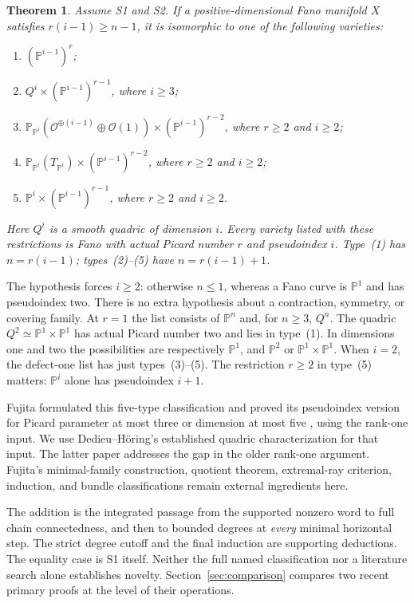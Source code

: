 \documentclass[11pt]{article}
\newtheorem{theorem}{Theorem}[section]
\theoremstyle{definition}\newtheorem{definition}[theorem]{Definition}
\theoremstyle{remark}\newtheorem{remark}[theorem]{Remark}
\newcommand{\PP}{\mathbb P}
\newcommand{\OO}{\mathcal O}
\begin{document}
\begin{theorem}\label{thm:main}
Assume S1 and S2. If a positive-dimensional Fano manifold $X$ satisfies
$r(i-1)\ge n-1$, it is isomorphic to one of the following varieties:
\begin{enumerate}[label=\textup{(\arabic*)}]
\item $(\PP^{i-1})^r$;
\item $Q^i\times(\PP^{i-1})^{r-1}$, where $i\ge3$;
\item $\PP_{\PP^i}(\OO^{\oplus(i-1)}\oplus\OO(1))
       \times(\PP^{i-1})^{r-2}$, where $r\ge2$ and $i\ge2$;
\item $\PP_{\PP^i}(T_{\PP^i})\times(\PP^{i-1})^{r-2}$,
       where $r\ge2$ and $i\ge2$;
\item $\PP^i\times(\PP^{i-1})^{r-1}$, where $r\ge2$ and $i\ge2$.
\end{enumerate}
Here $Q^i$ is a smooth quadric of dimension $i$. Every variety listed with
these restrictions is Fano with actual Picard number $r$ and pseudoindex $i$.
Type~\textup{(1)} has $n=r(i-1)$; types~\textup{(2)--(5)} have
$n=r(i-1)+1$.
\end{theorem}
The hypothesis forces $i\ge2$: otherwise $n\le1$, whereas a Fano curve is
$\PP^1$ and has pseudoindex two. There is no extra hypothesis about a
contraction, symmetry, or covering family. At $r=1$ the list consists of
$\PP^n$ and, for $n\ge3$, $Q^n$. The quadric $Q^2\simeq\PP^1\times\PP^1$
has actual Picard number two and lies in type~(1). In dimensions one and two
the possibilities are respectively $\PP^1$, and $\PP^2$ or
$\PP^1\times\PP^1$. When $i=2$, the defect-one list has just types~(3)--(5).
The restriction $r\ge2$ in type~(5) matters: $\PP^i$ alone has pseudoindex
$i+1$.

Fujita formulated this five-type classification and proved its pseudoindex
version for Picard parameter at most three or dimension at most five
\cite[Conjecture 1.4, Proposition 1.8, Remark 1.9]{fujita}, using the rank-one
input. We use Dedieu--H\"oring's established quadric characterization
\cite[Theorem 1.3]{dh} for that input. The latter paper addresses the gap in
the older rank-one argument. Fujita's minimal-family construction, quotient
theorem, extremal-ray criterion, induction, and bundle classifications remain
external ingredients here.

The addition is the integrated passage from the supported nonzero word to
full chain connectedness, and then to bounded degrees at \emph{every}
minimal horizontal step. The strict degree cutoff and the final induction
are supporting deductions. The equality case is S1 itself. Neither the full
named classification nor a literature search alone establishes novelty.
Section~\ref{sec:comparison} compares two recent primary proofs at the level
of their operations.
\end{document}

